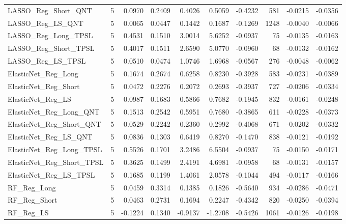 \begin{tabular}{llrrrrrrrr}
\cline{1-10}
LASSO\_Reg\_Short\_QNT & 5 & 0.0970 & 0.2409 & 0.4026 & 0.5059 & -0.4232 & 581 & -0.0215 & -0.0356 \\
\cline{1-10}
LASSO\_Reg\_LS\_QNT & 5 & 0.0065 & 0.0447 & 0.1442 & 0.1687 & -0.1269 & 1248 & -0.0040 & -0.0066 \\
\cline{1-10}
LASSO\_Reg\_Long\_TPSL & 5 & 0.4531 & 0.1510 & 3.0014 & 5.6252 & -0.0937 & 75 & -0.0135 & -0.0163 \\
\cline{1-10}
LASSO\_Reg\_Short\_TPSL & 5 & 0.4017 & 0.1511 & 2.6590 & 5.0770 & -0.0960 & 68 & -0.0132 & -0.0162 \\
\cline{1-10}
LASSO\_Reg\_LS\_TPSL & 5 & 0.0510 & 0.0474 & 1.0746 & 1.6968 & -0.0567 & 276 & -0.0048 & -0.0062 \\
\cline{1-10}
ElasticNet\_Reg\_Long & 5 & 0.1674 & 0.2674 & 0.6258 & 0.8230 & -0.3928 & 583 & -0.0231 & -0.0389 \\
\cline{1-10}
ElasticNet\_Reg\_Short & 5 & 0.0472 & 0.2276 & 0.2072 & 0.2693 & -0.3937 & 727 & -0.0206 & -0.0334 \\
\cline{1-10}
ElasticNet\_Reg\_LS & 5 & 0.0987 & 0.1683 & 0.5866 & 0.7682 & -0.1945 & 832 & -0.0161 & -0.0248 \\
\cline{1-10}
ElasticNet\_Reg\_Long\_QNT & 5 & 0.1513 & 0.2542 & 0.5951 & 0.7680 & -0.3865 & 611 & -0.0228 & -0.0373 \\
\cline{1-10}
ElasticNet\_Reg\_Short\_QNT & 5 & 0.0529 & 0.2242 & 0.2360 & 0.2992 & -0.4068 & 671 & -0.0202 & -0.0332 \\
\cline{1-10}
ElasticNet\_Reg\_LS\_QNT & 5 & 0.0836 & 0.1303 & 0.6419 & 0.8270 & -0.1470 & 838 & -0.0121 & -0.0192 \\
\cline{1-10}
ElasticNet\_Reg\_Long\_TPSL & 5 & 0.5526 & 0.1701 & 3.2486 & 6.5504 & -0.0937 & 75 & -0.0150 & -0.0171 \\
\cline{1-10}
ElasticNet\_Reg\_Short\_TPSL & 5 & 0.3625 & 0.1499 & 2.4191 & 4.6981 & -0.0958 & 68 & -0.0131 & -0.0157 \\
\cline{1-10}
ElasticNet\_Reg\_LS\_TPSL & 5 & 0.1685 & 0.1199 & 1.4061 & 2.0578 & -0.1044 & 494 & -0.0117 & -0.0166 \\
\cline{1-10}
RF\_Reg\_Long & 5 & 0.0459 & 0.3314 & 0.1385 & 0.1826 & -0.5640 & 934 & -0.0286 & -0.0471 \\
\cline{1-10}
RF\_Reg\_Short & 5 & 0.0463 & 0.2731 & 0.1694 & 0.2247 & -0.4342 & 820 & -0.0250 & -0.0394 \\
\cline{1-10}
RF\_Reg\_LS & 5 & -0.1224 & 0.1340 & -0.9137 & -1.2708 & -0.5426 & 1061 & -0.0126 & -0.0198 \\

\end{tabular}
